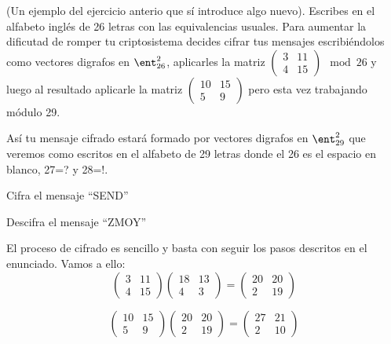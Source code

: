 \begin{problem}[11]
(Un ejemplo del ejercicio anterio que sí introduce algo nuevo). Escribes en el alfabeto inglés de 26 letras con las equivalencias usuales. Para aumentar la dificutad de romper tu criptosistema decides cifrar tus mensajes escribiéndolos como vectores digrafos en $\ent_{26}^2$, aplicarles la matriz $\left( \begin{array}{cc} 3 & 11 \\ 4 & 15 \end{array} \right) \mod 26$ y luego al resultado aplicarle la matriz $\left( \begin{array}{cc} 10 & 15 \\ 5 & 9 \end{array} \right) $ pero esta vez trabajando módulo 29.

Así tu mensaje cifrado estará formado por vectores digrafos en $\ent_{29}^2$ que veremos como escritos en el alfabeto de 29 letras donde el 26 es el espacio en blanco, 27=? y 28=!.

\ppart
Cifra el mensaje ``SEND''

\ppart
Descifra el mensaje ``ZMOY''

\solution
{}

\spart
El proceso de cifrado es sencillo y basta con seguir los pasos descritos en el enunciado. Vamos a ello:
\[\left( \begin{array}{cc}
 3 & 11 \\
 4 & 15
  \end{array} \right)
  \left( \begin{array}{cc}
  18 & 13\\
  4 &  3
  \end{array} \right) =  \left( \begin{array}{cc}
  20 & 20\\
  2  & 19
  \end{array} \right)\]

\[\left( \begin{array}{cc}
 10 & 15 \\
 5 & 9
  \end{array} \right)
  \left( \begin{array}{cc}
  20 & 20\\
  2 &  19
  \end{array} \right) =  \left( \begin{array}{cc}
  27 & 21\\
  2  & 10
  \end{array} \right)\]


\end{problem}
